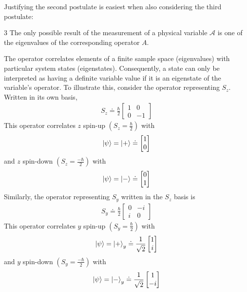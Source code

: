 Justifying the second postulate is easiest when also considering the third postulate:
\begin{Thm:Postulate}{3}
    The only possible result of the measurement of a physical variable $\mathcal{A}$ is one of the eigenvalues of the corresponding operator $A$.
\end{Thm:Postulate}

The operator correlates elements of a finite sample space (eigenvalues) with particular system states (eigenstates). Consequently, a state can only be interpreted as having a definite variable value if it is an eigenstate of the variable's operator. To illustrate this, consider the operator representing $S_z$. Written in its own basis,
\begin{align*}
    S_z \doteq \frac{\hbar}{2}\begin{bmatrix} 1 & 0 \\ 0 & -1 \end{bmatrix}
\end{align*}
This operator correlates $z$ spin-up $\left(S_z = \frac{\hbar}{2}\right)$ with
\begin{align*}
    \ket{\psi} = \ket{+} \doteq \begin{bmatrix} 1 \\ 0 \end{bmatrix}
\end{align*}
and $z$ spin-down $\left(S_z = \frac{-\hbar}{2}\right)$ with
\begin{align*}
    \ket{\psi} = \ket{-} \doteq \begin{bmatrix} 0 \\ 1 \end{bmatrix}
\end{align*}
Similarly, the operator representing $S_y$ written in the $S_z$ basis is
\begin{align*}
        S_y \doteq \frac{\hbar}{2}\begin{bmatrix} 0 & -i \\ i & 0 \end{bmatrix}
\end{align*}
This operator correlates $y$ spin-up $\left(S_y = \frac{\hbar}{2}\right)$ with
\begin{align*}
    \ket{\psi} = \ket{+}_y \doteq \frac{1}{\sqrt{2}}\begin{bmatrix} 1 \\ i \end{bmatrix}
\end{align*}
and $y$ spin-down $\left(S_y = \frac{-\hbar}{2}\right)$ with
\begin{align*}
    \ket{\psi} = \ket{-}_y \doteq \frac{1}{\sqrt{2}}\begin{bmatrix} 1 \\ -i \end{bmatrix}
\end{align*}

